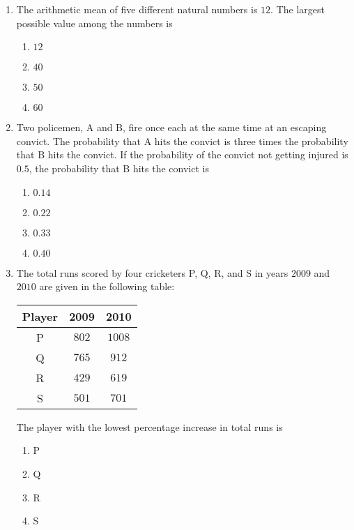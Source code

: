 \documentclass[journal,12pt,twocolumn]{IEEEtran}
\theoremstyle{remark}
\begin{document}
\begin{enumerate}[start=53]
    \item The arithmetic mean of five different natural numbers is $12$. The largest possible value among the numbers is
    \begin{enumerate}
        \item $12$
        \item $40$
        \item $50$
        \item $60$
    \end{enumerate}

    \item Two policemen, A and B, fire once each at the same time at an escaping convict. The probability that A hits the convict is three times the probability that B hits the convict. If the probability of the convict not getting injured is $0.5$, the probability that B hits the convict is
    \begin{enumerate}
        \item $0.14$
        \item $0.22$
        \item $0.33$
        \item $0.40$
    \end{enumerate}

    \item The total runs scored by four cricketers P, Q, R, and S in years $2009$ and $2010$ are given in the following table:
    
    \begin{center}
    \begin{tabular}{|c|c|c|}
        \hline
        Player & 2009 & 2010 \\
        \hline
        P & $802$ & $1008$ \\
        Q & $765$ & $912$ \\
        R & $429$ & $619$ \\
        S & $501$ & $701$ \\
        \hline
    \end{tabular}
    \end{center}

    The player with the lowest percentage increase in total runs is
    \begin{enumerate}
        \item P
        \item Q
        \item R
        \item S
    \end{enumerate}


\end{enumerate}
\end{document}
